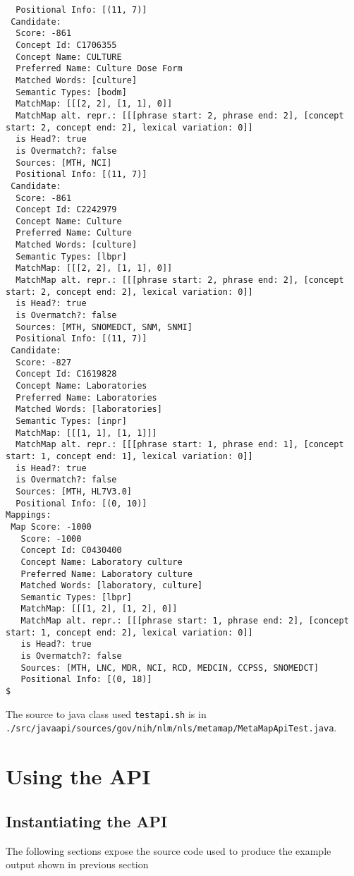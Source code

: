 \documentclass[11pt]{article}
\begin{document}
\begin{verbatim}
  Positional Info: [(11, 7)]
 Candidate:
  Score: -861
  Concept Id: C1706355
  Concept Name: CULTURE
  Preferred Name: Culture Dose Form
  Matched Words: [culture]
  Semantic Types: [bodm]
  MatchMap: [[[2, 2], [1, 1], 0]]
  MatchMap alt. repr.: [[[phrase start: 2, phrase end: 2], [concept start: 2, concept end: 2], lexical variation: 0]]
  is Head?: true
  is Overmatch?: false
  Sources: [MTH, NCI]
  Positional Info: [(11, 7)]
 Candidate:
  Score: -861
  Concept Id: C2242979
  Concept Name: Culture
  Preferred Name: Culture
  Matched Words: [culture]
  Semantic Types: [lbpr]
  MatchMap: [[[2, 2], [1, 1], 0]]
  MatchMap alt. repr.: [[[phrase start: 2, phrase end: 2], [concept start: 2, concept end: 2], lexical variation: 0]]
  is Head?: true
  is Overmatch?: false
  Sources: [MTH, SNOMEDCT, SNM, SNMI]
  Positional Info: [(11, 7)]
 Candidate:
  Score: -827
  Concept Id: C1619828
  Concept Name: Laboratories
  Preferred Name: Laboratories
  Matched Words: [laboratories]
  Semantic Types: [inpr]
  MatchMap: [[[1, 1], [1, 1]]]
  MatchMap alt. repr.: [[[phrase start: 1, phrase end: 1], [concept start: 1, concept end: 1], lexical variation: 0]]
  is Head?: true
  is Overmatch?: false
  Sources: [MTH, HL7V3.0]
  Positional Info: [(0, 10)]
Mappings:
 Map Score: -1000
   Score: -1000
   Concept Id: C0430400
   Concept Name: Laboratory culture
   Preferred Name: Laboratory culture
   Matched Words: [laboratory, culture]
   Semantic Types: [lbpr]
   MatchMap: [[[1, 2], [1, 2], 0]]
   MatchMap alt. repr.: [[[phrase start: 1, phrase end: 2], [concept start: 1, concept end: 2], lexical variation: 0]]
   is Head?: true
   is Overmatch?: false
   Sources: [MTH, LNC, MDR, NCI, RCD, MEDCIN, CCPSS, SNOMEDCT]
   Positional Info: [(0, 18)]
$
\end{verbatim}

The source to java class used \texttt{testapi.sh} is in
\texttt{./src/javaapi/sources/gov/nih/nlm/nls/metamap/MetaMapApiTest.java}.


\section{Using the API}
\label{Using the API}

\subsection{Instantiating the API}
\label{Instantiating the API}

The following sections expose the source code used to produce the
example output shown in previous section
\end{document}
